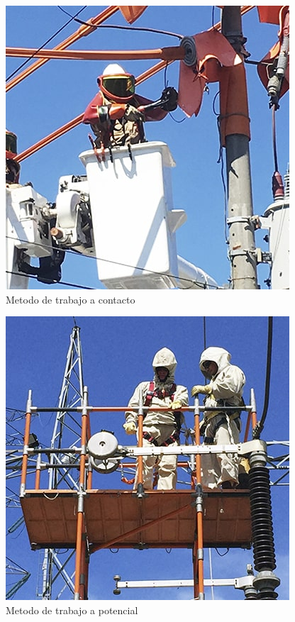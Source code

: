 \documentclass[a5paper]{book}%
\begin{document}
        \begin{figure}[H]
          \centering
          \caption{Metodo de trabajo a contacto}
          \label{fig:trabajocontacto}
          \includegraphics[width=\linewidth]{trabajo_contacto}
        \end{figure}


        \begin{figure}[H]
          \centering
          \caption{Metodo de trabajo a potencial}
          \label{fig:trabajoapotencial}
          \includegraphics[width=\linewidth]{trabajo_potencial}
        \end{figure}
\end{document}
